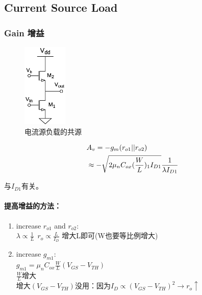 \documentclass[twoside,a4paper,openright,titlepage,draft]{ctexrep}
\begin{document}
\subsection{Current Source Load}
\vspace*{1em}
\subsubsection{Gain 增益}
\begin{multicols}{2}
    \begin{figure}[H]
        \centering
        \includegraphics[height=40mm]{currentsourceload.eps}
        \caption{电流源负载的共源}
        \label{fig:电流源负载的共源}
    \end{figure}
    \columnbreak

    \begin{align}
        &A_v = -g_m(r_{o1}||r_{o2}) \notag \\
        &\approx -\sqrt{2\mu_nC_{ox}(\frac{W}{L})_1I_{D1}}\frac{1}{\lambda I_{D1}}
    \end{align}
    \begin{center}
        与$I_{D1}$有关。
    \end{center}
\end{multicols}
\paragraph{提高增益的方法：}
\begin{enumerate}
    \item increase $r_{o1}$ and $r_{o2}$: \\
        $\lambda \propto \frac{1}{L}\ \ r_o\propto\frac{L}{I_D}$ 增大L即可(W也要等比例增大)
    \item increase $g_{m1}$: \\
        $g_{m1} = \mu_nC_{ox}\frac{W}{L}(V_{GS} - V_{TH})$ \\
        $\frac{W}{L}$增大 \\
        增大$(V_{GS} - V_{TH})$没用：因为$I_D\propto(V_{GS} - V_{TH})^2\rightarrow r_o\uparrow$
\end{enumerate}
\end{document}
